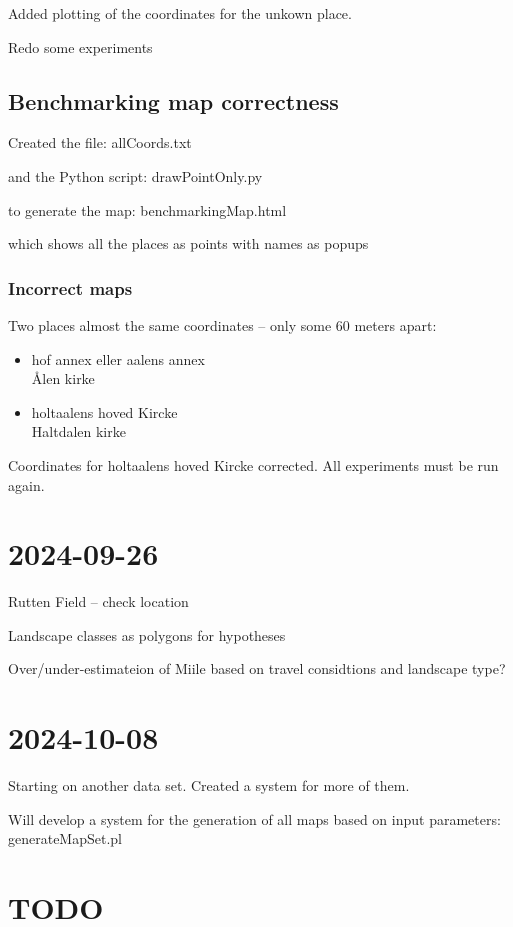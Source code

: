 \documentclass[12pt]{book}
\begin{document}
Added plotting of the coordinates for the unkown place.

Redo some experiments

\subsection{Benchmarking map correctness}

Created the file: allCoords.txt 

and the Python script: drawPointOnly.py

to generate the map: benchmarkingMap.html

which shows all the places as points with names as popups

\subsubsection{Incorrect maps}

Two places almost the same coordinates -- only some 60 meters apart:

\begin{itemize}
\item hof annex eller aalens annex \\
Ålen kirke
\item holtaalens hoved Kircke \\
Haltdalen kirke
\end{itemize}

Coordinates for holtaalens hoved Kircke corrected. All experiments must be run again. 

\section{2024-09-26}

Rutten Field -- check location

Landscape classes as polygons for hypotheses

Over/under-estimateion of Miile based on travel considtions and landscape type?

\section{2024-10-08}

Starting on another data set. Created a system for more of them. 

Will develop a system for the generation of all maps based on input parameters: generateMapSet.pl


\section{TODO}




\end{document}
